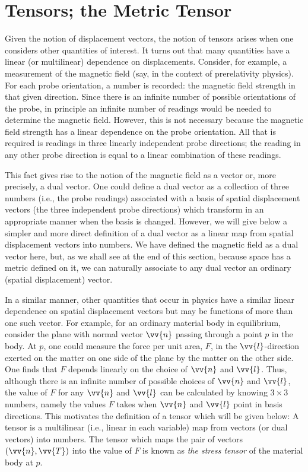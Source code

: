 \section{Tensors; the Metric Tensor}
Given the notion of displacement vectors, the notion of tensors arises when one considers other quantities of interest. It turns out that many quantities have a linear (or multilinear) dependence on displacements. Consider, for example, a measurement of the magnetic field (say, in the context of prerelativity physics). For each probe orientation, a number is recorded: the magnetic field strength in that given direction. Since there is an infinite number of possible orientations of the probe, in principle an infinite number of readings would be needed to determine the magnetic field. However, this is not necessary because the magnetic field strength has a linear dependence on the probe orientation. All that is required is readings in three linearly independent probe directions; the reading in any other probe direction is equal to a linear combination of these readings.

This fact gives rise to the notion of the magnetic field as a vector or, more precisely, a dual vector. One could define a dual vector as a collection of three numbers (i.e., the probe readings) associated with a basis of spatial displacement vectors (the three independent probe directions) which transform in an appropriate manner when the basis is changed. However, we will give below a simpler and more direct definition of a dual vector as a linear map from spatial displacement vectors into numbers. We have defined the magnetic field as a dual vector here, but, as we shall see at the end of this section, because space has a metric defined on it, we can naturally associate to any dual vector an ordinary (spatial displacement) vector.

In a similar manner, other quantities that occur in physics have a similar linear dependence on spatial displacement vectors but may be functions of more than one such vector. For example, for an ordinary material body in equilibrium, consider the plane with normal vector $\vv{n}$ passing through a point $p$ in the body. At $p$, one could measure the force per unit area, $F$, in the $\vv{l}$-direction exerted on the matter on one side of the plane by the matter on the other side. One finds that $F$ depends linearly on the choice of $\vv{n}$ and $\vv{l}$. Thus, although there is an infinite number of possible choices of $\vv{n}$ and $\vv{l}$, the value of $F$ for any $\vv{n}$ and $\vv{l}$ can be calculated by knowing $3\times 3$ numbers, namely the values $F$ takes when $\vv{n}$ and $\vv{l}$ point in basis directions. This motivates the definition of a tensor which will be given below: A tensor is a multilinear (i.e., linear in each variable) map from vectors (or dual vectors) into numbers. The tensor which maps the pair of vectors $(\vv{n}, \vv{T})$ into the value of $F$ is known as \emph{the stress tensor} of the material body at $p$.

